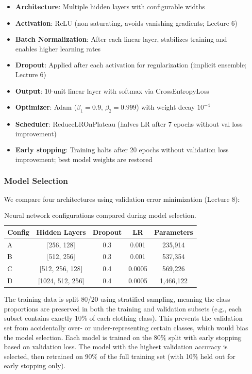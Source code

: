 \documentclass[11pt]{article}
\begin{document}
\begin{itemize}[nosep]
	\item \textbf{Architecture}: Multiple hidden layers with configurable widths
	\item \textbf{Activation}: ReLU (non-saturating, avoids vanishing gradients; Lecture 6)
	\item \textbf{Batch Normalization}: After each linear layer, stabilizes training and enables higher learning rates
	\item \textbf{Dropout}: Applied after each activation for regularization (implicit ensemble; Lecture 6)
	\item \textbf{Output}: 10-unit linear layer with softmax via CrossEntropyLoss
	\item \textbf{Optimizer}: Adam ($\beta_1=0.9$, $\beta_2=0.999$) with weight decay $10^{-4}$
	\item \textbf{Scheduler}: ReduceLROnPlateau (halves LR after 7 epochs without val loss improvement)
	\item \textbf{Early stopping}: Training halts after 20 epochs without validation loss improvement; best model weights are restored
\end{itemize}

\subsubsection{Model Selection}
We compare four architectures using validation error minimization (Lecture 8):

\begin{table}[H]
	\centering
	\caption{Neural network configurations compared during model selection.}
	\begin{tabular}{lcccc}
		\toprule
		Config & Hidden Layers    & Dropout & LR     & Parameters \\
		\midrule
		A      & [256, 128]       & 0.3     & 0.001  & 235,914    \\
		B      & [512, 256]       & 0.3     & 0.001  & 537,354    \\
		C      & [512, 256, 128]  & 0.4     & 0.0005 & 569,226    \\
		D      & [1024, 512, 256] & 0.4     & 0.0005 & 1,466,122  \\
		\bottomrule
	\end{tabular}
	\label{tab:nn_configs}
\end{table}

The training data is split 80/20 using stratified sampling, meaning the class proportions are preserved in both the training and validation subsets (e.g., each subset contains exactly 10\% of each clothing class). This prevents the validation set from accidentally over- or under-representing certain classes, which would bias the model selection. Each model is trained on the 80\% split with early stopping based on validation loss. The model with the highest validation accuracy is selected, then retrained on 90\% of the full training set (with 10\% held out for early stopping only).
\end{document}
